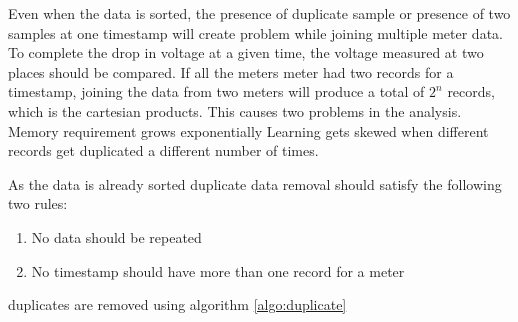 Even when the data is sorted, the presence of duplicate sample or presence of two samples at one timestamp will create problem while joining multiple meter data. To complete the drop in voltage at a given time, the voltage measured at two places should be compared. If all the meters meter had two records for a timestamp, joining the data from two meters will produce a total of $2^n$ records, which is the cartesian products. This causes two problems in the analysis.
    Memory requirement grows exponentially
    Learning gets skewed when different records get duplicated a different number of times.

As the data is already sorted duplicate data removal should satisfy the following two rules:
\begin{enumerate}
 \item No data should be repeated
 \item No timestamp should have more than one record for a meter
\end{enumerate}

duplicates are removed using algorithm \ref{algo:duplicate}
